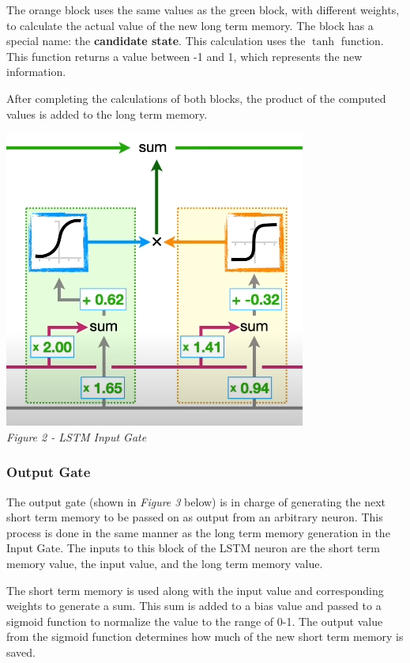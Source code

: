 \documentclass[12pt]{article}
\begin{document}
The orange block uses the same values as the green block, with different
weights, to calculate the actual value of the new long term memory. The block
has a special name: the \textbf{candidate state}. This calculation uses the
$\tanh$ function. This function returns a value between -1 and 1, which
represents the new information.

After completing the calculations of both blocks, the product of the computed
values is added to the long term memory.

\begin{center}
    \includegraphics{InputGate.png}\\
    \emph{Figure 2 - LSTM Input Gate}
\end{center}

\subsubsection{Output Gate}

The output gate (shown in \emph{Figure 3} below) is in charge of generating the
next short term memory to be passed on as output from an arbitrary neuron. This
process is done in the same manner as the long term memory generation in the
Input Gate. The inputs to this block of the LSTM neuron are the short term
memory value, the input value, and the long term memory value.

The short term memory is used along with the input value and corresponding
weights to generate a sum. This sum is added to a bias value and passed to a
sigmoid function to normalize the value to the range of 0-1. The output value
from the sigmoid function determines how much of the new short term memory is
saved.
\end{document}
